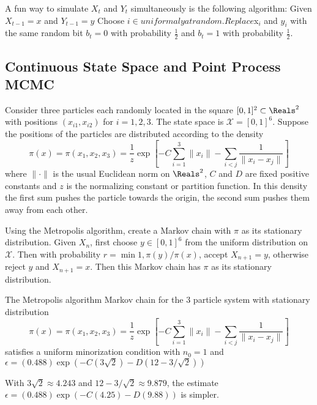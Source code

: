 \documentclass[12pt]{article}
\begin{document}
A fun way to simulate $X_t$ and $Y_t$ simultaneously is the following
algorithm:
Given $X_{t-1} = x$ and $Y_{t-1} = y$
Choose $i \in $$ uniformaly at random.
Replace $x$_i$ and $y_i$ with the same random bit $b_t = 0$ with
probability $\frac{1}{2}$ and $b_t = 1$ with
probability $\frac{1}{2}$.
\subsection*{Continuous State Space and Point Process MCMC}

Consider three particles each randomly located in the square \( [0,1]^2
\subset \Reals^2 \) with positions \( (x_{i1}, x_{i2}) \) for \( i =
1,2,3 \). The state space is \( \mathcal{X} = [0,1]^6 \).  Suppose the
positions of the particles are distributed according to the density
\[
    \pi(x) = \pi(x_1,x_2,x_3) = \frac{1}{z} \exp\left[ -C \sum\limits_{i=1}^3
    \|x_i\| - \sum\limits_{i<j} \frac{1}{\| x_i - x_j \|} \right]
\] where \( \| \cdot \| \) is the usual Euclidean norm on \( \Reals^2 \),
\( C \) and \( D \) are fixed positive constants and \( z \) is the
normalizing constant or partition function.  In this density the first
sum pushes the particle towards the origin, the second sum pushes them
away from each other.

Using the Metropolis algorithm, create a Markov chain with \( \pi \) as
its stationary distribution.  Given \( X_n \), first choose \( y \in [0,1]^6
\) from the uniform distribution on \( \mathcal{X} \).  Then with
probability \( r = \min{1, \pi(y)/\pi(x)} \), accept \( X_{n+1} = y \),
otherwise reject \( y \) and \( X_{n+1} = x \).  Then this Markov chain
has \( \pi \) as its stationary distribution.

\begin{lemma}
    The Metropolis algorithm Markov chain for the \( 3 \) particle
    system with stationary distribution
    \[
        \pi(x) = \pi(x_1,x_2,x_3) = \frac{1}{z} \exp\left[ -C \sum\limits_
        {i=1}^3 \|x_i\| - \sum\limits_{i<j} \frac{1}{\| x_i - x_j \|}
        \right]
    \] satisfies a uniform minorization condition with \( n_0 = 1 \) and
    \( \epsilon = (0.488) \exp(-C(3 \sqrt{2}) - D(12 - 3/ \sqrt{2})) \)
\end{lemma}

\begin{remark}

\end{remark}
With \( 3 \sqrt{2} \approx 4.243 \) and \( 12 - 3/\sqrt{2} \approx 9.879
\), the estimate \( \epsilon = (0.488) \exp(-C(4.25) - D(9.88)) \) is
simpler.
\end{document}
